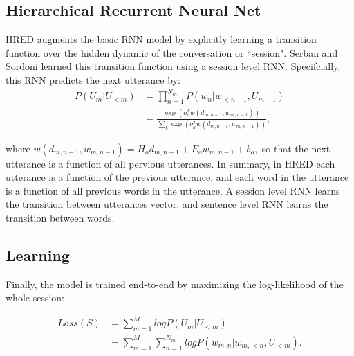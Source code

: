 \subsection{Hierarchical Recurrent Neural Net}

HRED augments the basic RNN model by explicitly learning a transition function over the hidden dynamic of the conversation or  ``session". Serban and Sordoni learned this transition function using a session level RNN. Specifcially, this RNN predicts the next utterance by:
    \begin{align*}
        P(U_m|U_{<m}) &= \prod_{n=1}^{N_m} P(w_n | w_{<n-1}, U_{m-1}) \\
                      &= \frac{\exp(o_{v}^T w(d_{m,n-1}, w_{{m,n-1}}))}{\sum_{k} \exp(o_{k}^Tw(d_{m,n-1}, w_{m,n-1}))},
    \end{align*}

where $w(d_{m,n-1}, w_{m,n-1}) = H_o d_{m,n-1} + E_o w_{m,n-1} + b_o,$ so that the next utterance is a function of all pervious utterances. In summary, in HRED each utterance is a function of the previous utterance, and each word in the utterance is a function of all previous words in the utterance. A session level RNN learns the transition between utterances vector, and sentence level RNN learns the transition between words. 

\subsection{Learning}

Finally, the model is trained end-to-end by maximizing the log-likelihood of the whole session:

    \begin{align*}
        Loss(S) &= \sum_{m=1}^M log P(U_m|U_{<m}) \\
                &= \sum_{m=1}^M \sum_{n=1}^{N_m} log P(w_{m,n} | w_{m,<n}, U_{<m}).
    \end{align*}




































